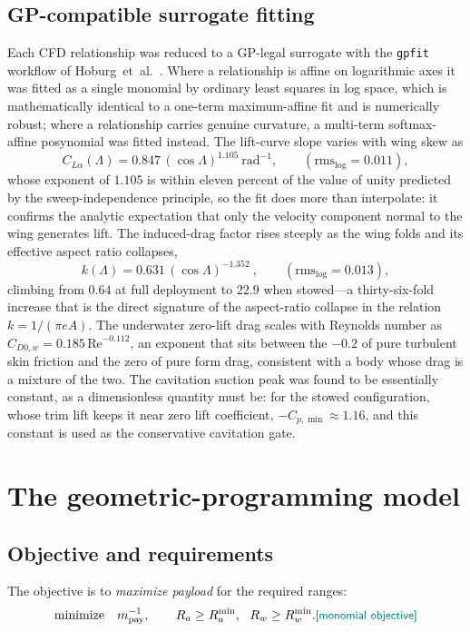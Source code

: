 \documentclass[conf]{new-aiaa}
\newcommand{\gpc}[1]{\textcolor{teal}{\small\textsf{[#1]}}} %
\begin{document}
\subsection{GP-compatible surrogate fitting}
Each CFD relationship was reduced to a GP-legal surrogate with the \texttt{gpfit} workflow of Hoburg~et~al.~\cite{hoburg2016data}. Where a
relationship is affine on logarithmic axes it was fitted as a single monomial by ordinary least
squares in log space, which is mathematically identical to a one-term maximum-affine fit and is
numerically robust; where a relationship carries genuine curvature, a multi-term softmax-affine
posynomial was fitted instead. The lift-curve slope varies with wing skew as
\begin{equation}
C_{L\alpha}(\Lambda) = 0.847\,(\cos\Lambda)^{1.105}\ \text{rad}^{-1},
\qquad(\text{rms}_{\log}=0.011),
\label{eq:clalpha}
\end{equation}
whose exponent of $1.105$ is within eleven percent of the value of unity predicted by the
sweep-independence principle, so the fit does more than interpolate: it confirms the analytic
expectation that only the velocity component normal to the wing generates lift. The induced-drag
factor rises steeply as the wing folds and its effective aspect ratio collapses,
\begin{equation}
k(\Lambda) = 0.631\,(\cos\Lambda)^{-1.352}\ ,
\qquad(\text{rms}_{\log}=0.013),
\label{eq:kschedule}
\end{equation}
climbing from $0.64$ at full deployment to $22.9$ when stowed---a thirty-six-fold increase that is
the direct signature of the aspect-ratio collapse in the relation $k=1/(\pi e A)$. The underwater
zero-lift drag scales with Reynolds number as $C_{D0,w}=0.185\,\mathrm{Re}^{-0.112}$, an exponent
that sits between the $-0.2$ of pure turbulent skin friction and the zero of pure form drag,
consistent with a body whose drag is a mixture of the two. The cavitation suction peak was found to
be essentially constant, as a dimensionless quantity must be: for the stowed configuration, whose
trim lift keeps it near zero lift coefficient, $-C_{p,\min}\approx1.16$, and this constant is used as
the conservative cavitation gate.

\section{The geometric-programming model}

\subsection{Objective and requirements}
The objective is to \emph{maximize payload} for the required ranges:
\begin{equation}
\text{minimize}\quad m_{\text{pay}}^{-1},\qquad R_a\ge R_a^{\min},\ \ R_w\ge R_w^{\min}.
\gpc{monomial objective}
\end{equation}
\end{document}
